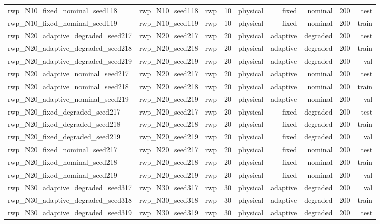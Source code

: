 \begin{tabular}{lrrrrrrrr}
rwp\_N10\_fixed\_nominal\_seed118 & rwp\_N10\_seed118 & rwp & 10 & physical & fixed & nominal & 200 & test \\
rwp\_N10\_fixed\_nominal\_seed119 & rwp\_N10\_seed119 & rwp & 10 & physical & fixed & nominal & 200 & train \\
rwp\_N20\_adaptive\_degraded\_seed217 & rwp\_N20\_seed217 & rwp & 20 & physical & adaptive & degraded & 200 & test \\
rwp\_N20\_adaptive\_degraded\_seed218 & rwp\_N20\_seed218 & rwp & 20 & physical & adaptive & degraded & 200 & train \\
rwp\_N20\_adaptive\_degraded\_seed219 & rwp\_N20\_seed219 & rwp & 20 & physical & adaptive & degraded & 200 & val \\
rwp\_N20\_adaptive\_nominal\_seed217 & rwp\_N20\_seed217 & rwp & 20 & physical & adaptive & nominal & 200 & test \\
rwp\_N20\_adaptive\_nominal\_seed218 & rwp\_N20\_seed218 & rwp & 20 & physical & adaptive & nominal & 200 & train \\
rwp\_N20\_adaptive\_nominal\_seed219 & rwp\_N20\_seed219 & rwp & 20 & physical & adaptive & nominal & 200 & val \\
rwp\_N20\_fixed\_degraded\_seed217 & rwp\_N20\_seed217 & rwp & 20 & physical & fixed & degraded & 200 & test \\
rwp\_N20\_fixed\_degraded\_seed218 & rwp\_N20\_seed218 & rwp & 20 & physical & fixed & degraded & 200 & train \\
rwp\_N20\_fixed\_degraded\_seed219 & rwp\_N20\_seed219 & rwp & 20 & physical & fixed & degraded & 200 & val \\
rwp\_N20\_fixed\_nominal\_seed217 & rwp\_N20\_seed217 & rwp & 20 & physical & fixed & nominal & 200 & test \\
rwp\_N20\_fixed\_nominal\_seed218 & rwp\_N20\_seed218 & rwp & 20 & physical & fixed & nominal & 200 & train \\
rwp\_N20\_fixed\_nominal\_seed219 & rwp\_N20\_seed219 & rwp & 20 & physical & fixed & nominal & 200 & val \\
rwp\_N30\_adaptive\_degraded\_seed317 & rwp\_N30\_seed317 & rwp & 30 & physical & adaptive & degraded & 200 & val \\
rwp\_N30\_adaptive\_degraded\_seed318 & rwp\_N30\_seed318 & rwp & 30 & physical & adaptive & degraded & 200 & train \\
rwp\_N30\_adaptive\_degraded\_seed319 & rwp\_N30\_seed319 & rwp & 30 & physical & adaptive & degraded & 200 & test \\

\end{tabular}
